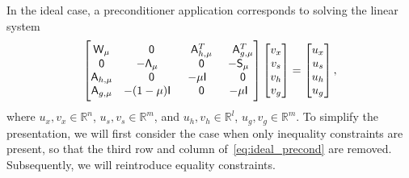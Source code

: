 In the ideal case, a preconditioner application corresponds to solving the
linear system
\begin{equation}\label{eq:ideal_precond}
  \begin{bmatrix} 
	\mathsf{W}_\mu & \phantom{-}\mathsf{0} & \phantom{-}\mathsf{A}_{h,\mu}^T  & \phantom{-}\mathsf{A}_{g,\mu}^T \\
	\mathsf{0}  & -\mathsf{\Lambda}_\mu & \phantom{-}\mathsf{0}   & -\mathsf{S}_\mu \\
	\mathsf{A}_{h, \mu} & \phantom{-}\mathsf{0} &  -\mu \mathsf{I} & \phantom{-}\mathsf{0}  \\
	\mathsf{A}_{g, \mu} &  -(1-\mu)\mathsf{I} &  \phantom{-}\mathsf{0}     &   -\mu \mathsf{I}
\end{bmatrix}
\begin{bmatrix} v_x \\ v_s \\ v_{h} \\  v_{g} \end{bmatrix} 
= 
\begin{bmatrix} u_x \\ u_s \\ u_{h} \\ u_{g}  \end{bmatrix},
\end{equation}
where $u_x, v_x \in \mathbb{R}^n$, $u_s, v_s \in \mathbb{R}^{m}$, and $u_h, v_h \in
\mathbb{R}^{l}$,  $u_g, v_g \in \mathbb{R}^{m}$.  To simplify the presentation, 
we will first consider the case when only inequality constraints are present, 
so that the third row and column of~\eqref{eq:ideal_precond} are removed.  
Subsequently, we will reintroduce equality constraints.



